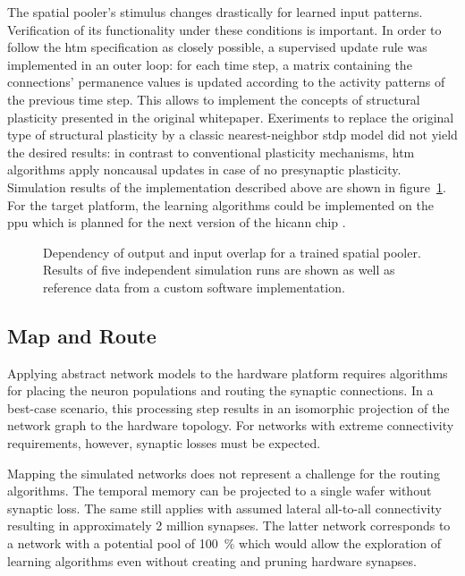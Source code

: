 The spatial pooler's stimulus changes drastically for learned input patterns. Verification of its functionality under these conditions is important. In order to follow the \gls{htm} specification as closely possible, a supervised update rule was implemented in an outer loop: for each time step, a matrix containing the connections' permanence values is updated according to the activity patterns of the previous time step. This allows to implement the concepts of structural plasticity presented in the original whitepaper. Exeriments to replace the original type of structural plasticity by a classic nearest-neighbor \gls{stdp} model did not yield the desired results: in contrast to conventional plasticity mechanisms, \gls{htm} algorithms apply noncausal updates in case of no presynaptic plasticity. Simulation results of the implementation described above are shown in figure~\ref{fig:spatial_pooler_learning}. For the target platform, the learning algorithms could be implemented on the \gls{ppu} which is planned for the next version of the \gls{hicann} chip \citep{friedmann2013phd}.

\begin{figure}
	\begin{center}
		
	\end{center}
	\caption{Dependency of output and input overlap for a trained spatial pooler. Results of five independent simulation runs are shown as well as reference data from a custom software implementation.}
	\label{fig:spatial_pooler_learning}
\end{figure}

\subsection{Map and Route}

Applying abstract network models to the hardware platform requires algorithms for placing the neuron populations and routing the synaptic connections. In a best-case scenario, this processing step results in an isomorphic projection of the network graph to the hardware topology. For networks with extreme connectivity requirements, however, synaptic losses must be expected.

Mapping the simulated networks does not represent a challenge for the routing algorithms. The temporal memory can be projected to a single wafer without synaptic loss. The same still applies with assumed lateral all-to-all connectivity resulting in approximately 2 million synapses. The latter network corresponds to a network with a potential pool of \SI{100}{\%} which would allow the exploration of learning algorithms even without creating and pruning hardware synapses.

